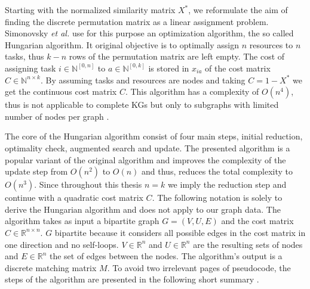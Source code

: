 {%
Starting with the normalized similarity matrix $X^*$, we reformulate the aim of finding the discrete permutation matrix as a linear assignment problem. Simonovsky \textit{et al.} \cite{silver_mastering_2017}use for this purpose an optimization algorithm, the so called Hungarian algorithm. It original objective is to optimally assign $n$ resources to $n$ tasks, thus $k-n$ rows of the permutation matrix are left empty. The cost of assigning task $i \in \mathbb{N}^{[0,n]}$ to $a \in \mathbb{N}^{[0,k]}$ is stored in $x_{ia}$ of the cost matrix $C \in \mathbb{N}^{n \times k}$. By assuming tasks and resources are nodes and taking $C=1-X^*$ we get the continuous cost matrix $C$. This algorithm has a complexity of $O\left(n^{4}\right)$, thus is not applicable to complete KGs but only to subgraphs with limited number of nodes per graph \cite{date_gpu-accelerated_2016}.

The core of the Hungarian algorithm consist of four main steps, initial reduction, optimality check, augmented search and update. The presented algorithm is a popular variant of the original algorithm and improves the complexity of the update step from $O\left(n^{2}\right)$ to $O\left(n\right)$ and thus, reduces the total complexity to $O\left(n^{3}\right)$. Since throughout this thesis $n=k$ we imply the reduction step and continue with a quadratic cost matrix $C$. The following notation is solely to derive the Hungarian algorithm and does not apply to our graph data. The algorithm takes as input a bipartite graph $G=(V, U, E)$ and the cost matrix $C \in \mathbb{R}^{n \times n}$. $G$ bipartite because it considers all possible edges in the cost matrix in one direction and no self-loops. $V \in \mathbb{R}^n$ and $U \in \mathbb{R}^n$ are the resulting sets of nodes and $E \in \mathbb{R}^{n}$ the set of edges between the nodes. The algorithm's output is a discrete matching matrix $M$. To avoid two irrelevant pages of pseudocode, the steps of the algorithm are presented in the following short summary \cite{mills-tettey_dynamic_nodate}.

}
